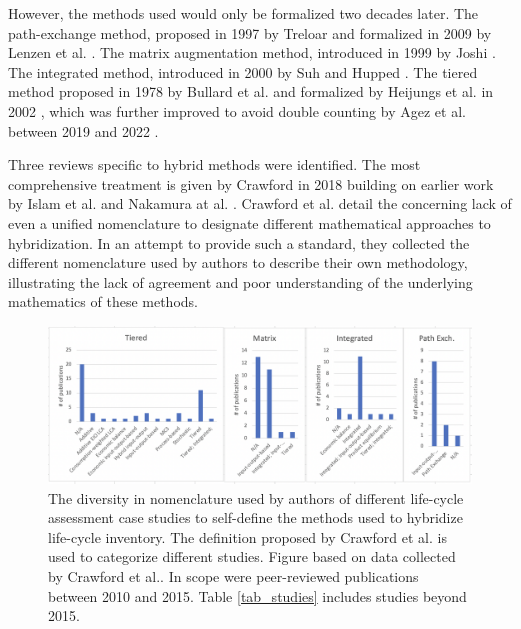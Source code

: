 \documentclass{article}
\begin{document}
        However, the methods used would only be formalized two decades later. The path-exchange method, proposed in 1997 by Treloar \cite{treloar_extracting_1997} and formalized in 2009 by Lenzen et al. \cite{lenzen_path_2009}. The matrix augmentation method, introduced in 1999 by Joshi \cite{joshi_product_1999}. The integrated method, introduced in 2000 by Suh and Hupped \cite{suh_gearing_2000}. The tiered method proposed in 1978 by Bullard et al. \cite{bullard_net_1978} and formalized by Heijungs et al. in 2002 \cite{heijungs_computational_2002}, which was further improved to avoid double counting by Agez et al. between 2019 and 2022 \cite{agez_lifting_2019}\cite{agez_hybridization_2020}\cite{agez_correcting_2022}.

        Three reviews specific to hybrid methods were identified. The most comprehensive treatment is given by Crawford in 2018 \cite{crawford_hybrid_2018} building on earlier work by Islam et al. \cite{islam_review_2016} and Nakamura at al. \cite{nakamura_inputoutput_2016}. Crawford et al. detail the concerning lack of even a unified nomenclature to designate different mathematical approaches to hybridization. In an attempt to provide such a standard, they collected the different nomenclature used by authors to describe their own methodology, illustrating the lack of agreement and poor understanding of the underlying mathematics of these methods. 
        
        \begin{figure}[h!]
        	\centering
        	\includegraphics[width=\textwidth]{figures/nomenclature.png}
        	\caption{The diversity in nomenclature used by authors of different life-cycle assessment case studies to self-define the methods used to hybridize life-cycle inventory. The definition proposed by Crawford et al. is used to categorize different studies. Figure based on data collected by Crawford et al.\cite{crawford_hybrid_2018}. In scope were peer-reviewed publications between 2010 and 2015. Table \ref{tab_studies} includes studies beyond 2015.}
        	\label{fig:performance}
        \end{figure}
        
\end{document}
